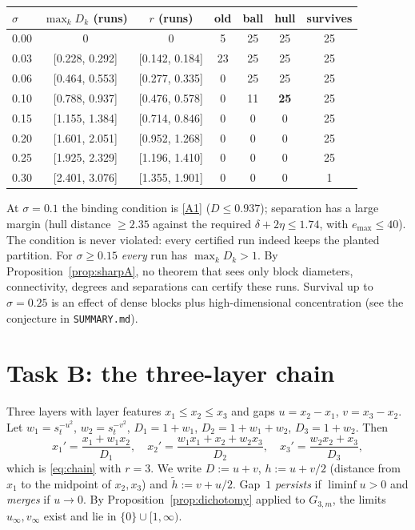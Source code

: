 \documentclass[11pt]{article}
\theoremstyle{definition}
\theoremstyle{remark}
\begin{document}
\begin{center}
\small
\begin{tabular}{lcccccc}
\toprule
$\sigma$ & $\max_kD_k$ (runs) & $r$ (runs) & old & ball & hull & survives \\
\midrule
0.00 & 0 & 0 & 5 & 25 & 25 & 25\\
0.03 & [0.228, 0.292] & [0.142, 0.184] & 23 & 25 & 25 & 25\\
0.06 & [0.464, 0.553] & [0.277, 0.335] & 0 & 25 & 25 & 25\\
0.10 & [0.788, 0.937] & [0.476, 0.578] & 0 & 11 & \textbf{25} & 25\\
0.15 & [1.155, 1.384] & [0.714, 0.846] & 0 & 0 & 0 & 25\\
0.20 & [1.601, 2.051] & [0.952, 1.268] & 0 & 0 & 0 & 25\\
0.25 & [1.925, 2.329] & [1.196, 1.410] & 0 & 0 & 0 & 25\\
0.30 & [2.401, 3.076] & [1.355, 1.901] & 0 & 0 & 0 & 1\\
\bottomrule
\end{tabular}
\end{center}
At $\sigma=0.1$ the binding condition is \eqref{A1} ($D\le0.937$); separation has a large margin
(hull distance $\ge2.35$ against the required $\delta+2\eta\le1.74$, with $e_{\max}\le40$). The condition is
never violated: every certified run indeed keeps the planted partition. For $\sigma\ge0.15$
\emph{every} run has $\max_kD_k>1$. By Proposition~\ref{prop:sharpA}, no theorem that sees only block diameters,
connectivity, degrees and separations can certify these runs. Survival up to $\sigma=0.25$ is an effect of
dense blocks plus high-dimensional concentration (see the conjecture in \texttt{SUMMARY.md}).

\section{Task B: the three-layer chain}

Three layers with layer features $x_1\le x_2\le x_3$ and gaps $u=x_2-x_1$, $v=x_3-x_2$. Let $w_1=s_t^{-u^2}$,
$w_2=s_t^{-v^2}$, $D_1=1+w_1$, $D_2=1+w_1+w_2$, $D_3=1+w_2$. Then
\[
x_1'=\frac{x_1+w_1x_2}{D_1},\quad x_2'=\frac{w_1x_1+x_2+w_2x_3}{D_2},\quad x_3'=\frac{w_2x_2+x_3}{D_3},
\]
which is \eqref{eq:chain} with $r=3$. We write $D:=u+v$, $h:=u+v/2$ (distance from $x_1$ to the midpoint of
$x_2,x_3$) and $\tilde h:=v+u/2$. Gap~$1$ \emph{persists} if $\liminf u>0$ and \emph{merges} if $u\to0$. By
Proposition~\ref{prop:dichotomy} applied to $G_{3,m}$, the limits $u_\infty,v_\infty$ exist and lie in
$\{0\}\cup[1,\infty)$.
\end{document}

